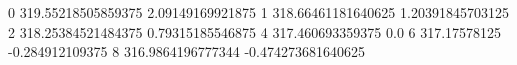0 319.55218505859375 2.09149169921875
1 318.66461181640625 1.20391845703125
2 318.25384521484375 0.79315185546875
4 317.460693359375 0.0
6 317.17578125 -0.284912109375
8 316.9864196777344 -0.474273681640625
